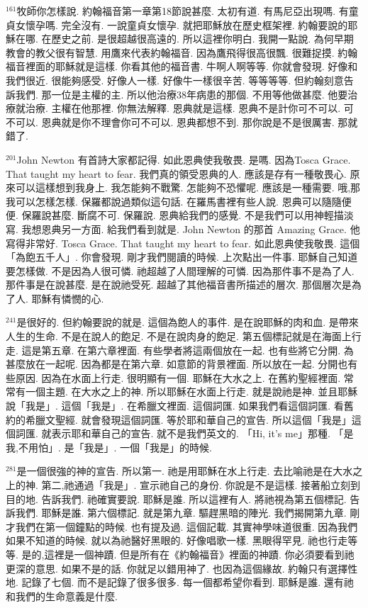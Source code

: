 \documentclass{book}
\begin{document}
$^{161}$牧師你怎樣說.
約翰福音第一章第18節說甚麼.
太初有道.
有馬尼亞出現嗎.
有童貞女懷孕嗎.
完全沒有.
一說童貞女懷孕.
就把耶穌放在歷史框架裡.
約翰要說的耶穌在哪.
在歷史之前.
是很超越很高遠的.
所以這裡你明白.
我開一點說.
為何早期教會的教父很有智慧.
用鷹來代表約翰福音.
因為鷹飛得很高很飄.
很難捉摸.
約翰福音裡面的耶穌就是這樣.
你看其他的福音書.
牛啊人啊等等.
你就會發現.
好像和我們很近.
很能夠感受.
好像人一樣.
好像牛一樣很辛苦.
等等等等.
但約翰刻意告訴我們.
那一位是主權的主.
所以他治療38年病患的那個.
不用等他做甚麼.
他要治療就治療.
主權在他那裡.
你無法解釋.
恩典就是這樣.
恩典不是計你可不可以.
可不可以.
恩典就是你不理會你可不可以.
恩典都想不到.
那你說是不是很厲害.
那就錯了.

$^{201}$John Newton 有首詩大家都記得.
如此恩典使我敬畏.
是嗎.
因為Tosca Grace.
That taught my heart to fear.
我們真的領受恩典的人.
應該是存有一種敬畏心.
原來可以這樣想到我身上.
我怎能夠不戰驚.
怎能夠不恐懼呢.
應該是一種需要.
哦,那我可以怎樣怎樣.
保羅都說過類似這句話.
在羅馬書裡有些人說.
恩典可以隨隨便便.
保羅說甚麼.
斷腐不可.
保羅說.
恩典給我們的感覺.
不是我們可以用神輕描淡寫.
我想恩典另一方面.
給我們看到就是.
John Newton 的那首 Amazing Grace.
他寫得非常好.
Tosca Grace.
That taught my heart to fear.
如此恩典使我敬畏.
這個「為飽五千人」.
你會發現.
剛才我們閱讀的時候.
上次點出一件事.
耶穌自己知道要怎樣做.
不是因為人很可憐.
祂超越了人間理解的可憐.
因為那件事不是為了人.
那件事是在說甚麼.
是在說祂受死.
超越了其他福音書所描述的層次.
那個層次是為了人.
耶穌有憐憫的心.

$^{241}$是很好的.
但約翰要說的就是.
這個為飽人的事件.
是在說耶穌的肉和血.
是帶來人生的生命.
不是在說人的飽足.
不是在說肉身的飽足.
第五個標記就是在海面上行走.
這是第五章.
在第六章裡面.
有些學者將這兩個放在一起.
也有些將它分開.
為甚麼放在一起呢.
因為都是在第六章.
如意節的背景裡面.
所以放在一起.
分開也有些原因.
因為在水面上行走.
很明顯有一個.
耶穌在大水之上.
在舊約聖經裡面.
常常有一個主題.
在大水之上的神.
所以耶穌在水面上行走.
就是說祂是神.
並且耶穌說「我是」.
這個「我是」.
在希臘文裡面.
這個詞匯.
如果我們看這個詞匯.
看舊約的希臘文聖經.
就會發現這個詞匯.
等於耶和華自己的宣告.
所以這個「我是」這個詞匯.
就表示耶和華自己的宣告.
就不是我們英文的.
「Hi, it's me」那種.
「是我,不用怕」.
是「我是」.
一個「我是」的時候.

$^{281}$是一個很強的神的宣告.
所以第一.
祂是用耶穌在水上行走.
去比喻祂是在大水之上的神.
第二,祂通過「我是」.
宣示祂自己的身份.
你說是不是這樣.
接著船立刻到目的地.
告訴我們.
祂確實要說.
耶穌是誰.
所以這裡有人.
將祂視為第五個標記.
告訴我們.
耶穌是誰.
第六個標記.
就是第九章.
驅趕黑暗的陣光.
我們揭開第九章.
剛才我們在第一個鐘點的時候.
也有提及過.
這個記載.
其實神學味道很重.
因為我們如果不知道的時候.
就以為祂醫好黑眼的.
好像唱歌一樣.
黑眼得罕見.
祂也行走等等.
是的,這裡是一個神蹟.
但是所有在《約翰福音》裡面的神蹟.
你必須要看到祂更深的意思.
如果不是的話.
你就足以錯用神了.
也因為這個緣故.
約翰只有選擇性地.
記錄了七個.
而不是記錄了很多很多.
每一個都希望你看到.
耶穌是誰.
還有祂和我們的生命意義是什麼.
\end{document}
